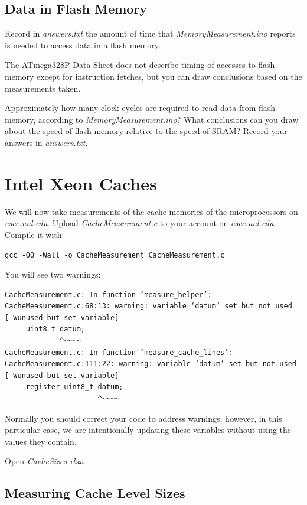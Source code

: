 \subsection{Data in Flash Memory}

Record in \textit{answers.txt} the amount of time that
\textit{MemoryMeasurement.ino} reports is needed to access data in a flash
memory.

The ATmega328P Data Sheet does not describe timing of accesses to flash memory
except for instruction fetches, but you can draw conclusions based on the
measurements taken.

Approximately how many clock cycles are required to read data from flash
memory, according to \textit{MemoryMeasurement.ino}? What conclusions can you
draw about the speed of flash memory relative to the speed of SRAM? Record your
answers in \textit{answers.txt}.

\section{Intel Xeon Caches}

We will now take measurements of the cache memories of the microprocessors on
\textit{csce.unl.edu}. Upload \textit{CacheMeasurement.c} to your account on
\textit{csce.unl.edu}. Compile it with:

\texttt{gcc -O0 -Wall -o CacheMeasurement CacheMeasurement.c}

You will see two warnings:
\begin{verbatim}
CacheMeasurement.c: In function ‘measure_helper’:
CacheMeasurement.c:68:13: warning: variable ‘datum’ set but not used [-Wunused-but-set-variable]
     uint8_t datum;
             ^~~~~
CacheMeasurement.c: In function ‘measure_cache_lines’:
CacheMeasurement.c:111:22: warning: variable ‘datum’ set but not used [-Wunused-but-set-variable]
     register uint8_t datum;
                      ^~~~~
\end{verbatim}

Normally you should correct your code to address warnings; however, in this
particular case, we are intentionally updating these variables without using
the values they contain.

Open \textit{CacheSizes.xlsx}.

\subsection{Measuring Cache Level Sizes}

